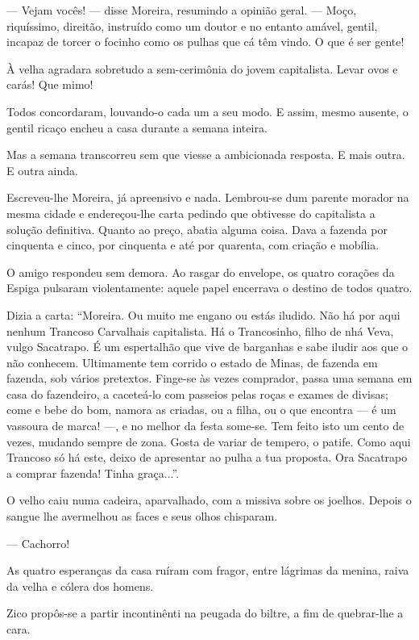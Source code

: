 --- Vejam vocês! --- disse Moreira, resumindo a opinião geral. --- Moço,
riquíssimo, direitão, instruído como um doutor e no entanto amável,
gentil, incapaz de torcer o focinho como os pulhas que cá têm vindo. O
que é ser gente!

À velha agradara sobretudo a sem-cerimônia do jovem capitalista. Levar
ovos e carás! Que mimo!

Todos concordaram, louvando-o cada um a seu modo. E assim, mesmo
ausente, o gentil ricaço encheu a casa durante a semana inteira.

Mas a semana transcorreu sem que viesse a ambicionada resposta. E mais
outra. E outra ainda.

Escreveu-lhe Moreira, já apreensivo e nada. Lembrou-se dum parente
morador na mesma cidade e endereçou-lhe carta pedindo que obtivesse do
capitalista a solução definitiva. Quanto ao preço, abatia alguma coisa.
Dava a fazenda por cinquenta e cinco, por cinquenta e até por quarenta,
com criação e mobília.

O amigo respondeu sem demora. Ao rasgar do envelope, os quatro corações
da Espiga pulsaram violentamente: aquele papel encerrava o destino de
todos quatro.

Dizia a carta: ``Moreira. Ou muito me engano ou estás iludido. Não há
por aqui nenhum Trancoso Carvalhais capitalista. Há o Trancosinho, filho
de nhá Veva, vulgo Sacatrapo. É um espertalhão que vive de barganhas e
sabe iludir aos que o não conhecem. Ultimamente tem corrido o estado de
Minas, de fazenda em fazenda, sob vários pretextos. Finge-se às vezes
comprador, passa uma semana em casa do fazendeiro, a caceteá-lo com
passeios pelas roças e exames de divisas; come e bebe do bom, namora as
criadas, ou a filha, ou o que encontra --- é um vassoura de marca! ---,
e no melhor da festa some-se. Tem feito isto um cento de vezes, mudando
sempre de zona. Gosta de variar de tempero, o patife. Como aqui Trancoso
só há este, deixo de apresentar ao pulha a tua proposta. Ora Sacatrapo a
comprar fazenda! Tinha graça...''.

O velho caiu numa cadeira, aparvalhado, com a missiva sobre os joelhos.
Depois o sangue lhe avermelhou as faces e seus olhos chisparam.

--- Cachorro!

As quatro esperanças da casa ruíram com fragor, entre lágrimas da
menina, raiva da velha e cólera dos homens.

Zico propôs-se a partir incontinênti na peugada do biltre, a fim de
quebrar-lhe a cara.

